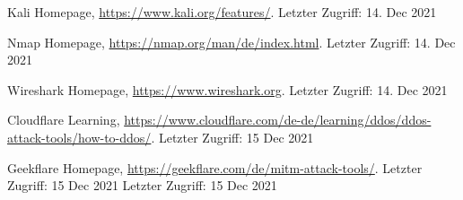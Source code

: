 \begin{thebibliography}{8}
Kali Homepage, \url{https://www.kali.org/features/}. Letzter Zugriff: 14. Dec 2021

Nmap Homepage, \url{https://nmap.org/man/de/index.html}. Letzter Zugriff: 14. Dec 2021

Wireshark Homepage, \url{https://www.wireshark.org}. Letzter Zugriff: 14. Dec 2021

Cloudflare Learning, \url{ https://www.cloudflare.com/de-de/learning/ddos/ddos-attack-tools/how-to-ddos/}. Letzter Zugriff: 15 Dec 2021

Geekflare Homepage, \url{https://geekflare.com/de/mitm-attack-tools/}. Letzter Zugriff: 15 Dec 2021 Letzter Zugriff: 15 Dec 2021










\end{thebibliography}